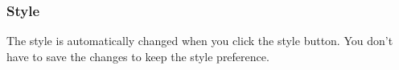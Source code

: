 \documentclass[a4paper]{article}
\begin{document}
\subsubsection{Style}
The style is automatically changed when you click the style button. You don't have to save the changes to keep the style preference. 

%
\end{document}
